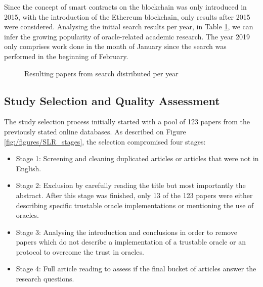 Since the concept of smart contracts on the blockchain was only introduced in 2015, with the introduction of the Ethereum blockchain, only results after 2015 were considered. Analysing the initial search results per year, in Table \ref{search-results-per-year}, we can infer the growing popularity of oracle-related academic research. The year 2019 only comprises work done in the month of January since the search was performed in the beginning of February.

\begin{figure}[H]
\centering
{}
\caption{Resulting papers from search distributed per year}
\label{search-results-per-year}
\end{figure}


\subsection{Study Selection and Quality Assessment}

The study selection process initially started with a pool of 123 papers from the previously stated online databases. As described on Figure \ref{fig:/figures/SLR_stages}, the selection compromised four stages:
\begin{itemize}
\item Stage 1: Screening and cleaning duplicated articles or articles that were not in English.
\item Stage 2: Exclusion by carefully reading the title but most importantly the abstract. After this stage was finished, only 13 of the 123 papers were either describing specific trustable oracle implementations or mentioning the use of oracles.
\item Stage 3: Analysing the introduction and conclusions in order to remove papers which do not describe a implementation of a trustable oracle or an protocol to overcome the trust in oracles.
\item Stage 4: Full article reading to assess if the final bucket of articles answer the research questions.
\end{itemize} 

